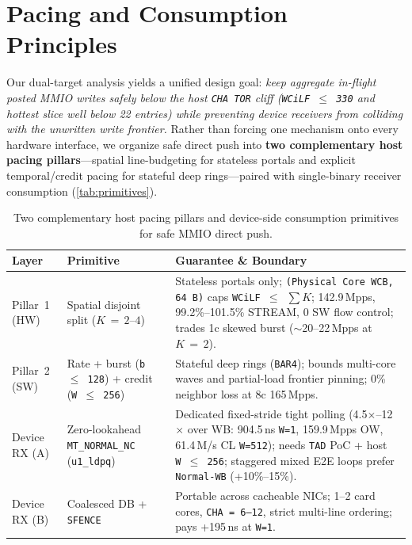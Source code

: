 \section{Pacing and Consumption Principles}
\label{sec:design}

Our dual-target analysis yields a unified design goal: \emph{keep aggregate in-flight posted MMIO writes safely below the host \texttt{CHA TOR} cliff (\texttt{WCiLF\,$\le$\,330} and hottest slice well below 22 entries) while preventing device receivers from colliding with the unwritten write frontier.} Rather than forcing one mechanism onto every hardware interface, we organize safe direct push into \textbf{two complementary host pacing pillars}---spatial line-budgeting for stateless portals and explicit temporal/credit pacing for stateful deep rings---paired with single-binary receiver consumption (\autoref{tab:primitives}).

\begin{table}[t]
  \centering
  \scriptsize
  \setlength{\tabcolsep}{2.4pt}
  \begin{tabularx}{\columnwidth}{@{}>{\raggedright\arraybackslash}p{0.62in} >{\raggedright\arraybackslash}p{0.88in} Y@{}}
    \toprule
    \textbf{Layer} & \textbf{Primitive} & \textbf{Guarantee \& Boundary} \\
    \midrule
    Pillar~1 (HW) & Spatial disjoint split ($K\,=\,2$--$4$) & Stateless portals only; \texttt{(Physical Core WCB, 64\,B)} caps \texttt{WCiLF\,$\le$\,$\sum K$}; 142.9\,Mpps, 99.2\%--101.5\% STREAM, 0 SW flow control; trades 1c skewed burst ($\sim$20--22\,Mpps at $K\,=\,2$). \\
    Pillar~2 (SW) & Rate + burst (\texttt{b\,$\le$\,128}) + credit (\texttt{W\,$\le$\,256}) & Stateful deep rings (\texttt{BAR4}); bounds multi-core waves and partial-load frontier pinning; 0\% neighbor loss at 8c 165\,Mpps. \\
    Device RX (A) & Zero-lookahead \texttt{MT\_NORMAL\_NC} (\texttt{u1\_ldpq}) & Dedicated fixed-stride tight polling (4.5$\times$--12$\times$ over WB: 904.5\,ns \texttt{W=1}, 159.9\,Mpps OW, 61.4\,M/s CL \texttt{W=512}); needs \texttt{TAD} PoC + host \texttt{W\,$\le$\,256}; staggered mixed E2E loops prefer \texttt{Normal-WB} (+10\%--15\%). \\
    Device RX (B) & Coalesced DB + \texttt{SFENCE} & Portable across cacheable NICs; 1--2 card cores, \texttt{CHA\,=\,6--12}, strict multi-line ordering; pays +195\,ns at \texttt{W=1}. \\
    \bottomrule
  \end{tabularx}
  \caption{Two complementary host pacing pillars and device-side consumption primitives for safe MMIO direct push.}
  \label{tab:primitives}
\end{table}

